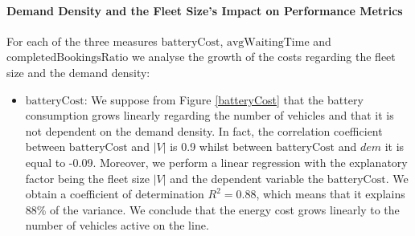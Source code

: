 \documentclass[12pt,a4paper]{article}
\begin{document}
\paragraph{Demand Density and the Fleet Size's Impact on Performance Metrics}
For each of the three measures $\text{batteryCost}$, $\text{avgWaitingTime}$ and $\text{completedBookingsRatio}$ we analyse the growth of the costs regarding the fleet size and the demand density:
\begin{itemize}
\item $\text{batteryCost}$: We suppose from Figure \ref{batteryCost} that the battery consumption grows linearly regarding the number of vehicles and that it is not dependent on the demand density. In fact, the correlation coefficient between $\text{batteryCost}$ and $|V|$ is 0.9 whilst between $\text{batteryCost}$ and $dem$ it is equal to -0.09. Moreover, we perform a linear regression with the explanatory factor being the fleet size $|V|$ and the dependent variable the $\text{batteryCost}$. We obtain a coefficient of determination $R^{2} = 0.88$, which means that it explains 88\% of the variance. We conclude that the energy cost grows linearly to the number of vehicles active on the line. 


\end{itemize}
\end{document}
